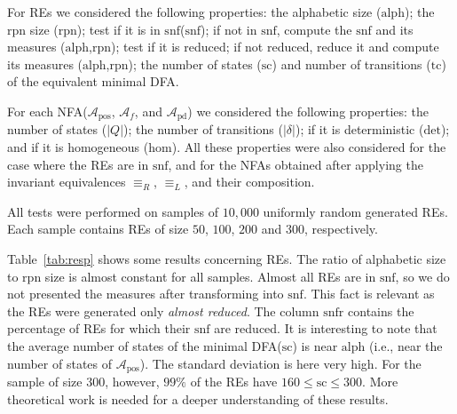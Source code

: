 \documentclass{llncs}
\newcommand{\dfa}{DFA\xspace}
\newcommand{\NFA}{NFA\xspace}
\newcommand{\nfas}{NFAs\xspace}
\newcommand{\res}{REs\xspace}
\newcommand{\snf}{\mbox{$\mathrm{snf}$}\xspace}
\newcommand{\snfr}{\mbox{$\mathrm{snfr}$}\xspace}
\newcommand{\alphw}{\mbox{$\mathrm{alph}$}\xspace}
\newcommand{\rpn}{\mbox{$\mathrm{rpn}$}\xspace}
\newcommand{\stc}{\mbox{$\mathrm{sc}$}\xspace}
\newcommand{\ttc}{\mbox{$\mathrm{tc}$}\xspace}
\newcommand{\isdet}{\mbox{$\mathrm{det}$}\xspace}
\newcommand{\ishom}{\mbox{$\mathrm{hom}$}\xspace}
\newcommand{\nfa}{\mathcal{A}}
\newcommand{\pos}{{\mathrm{pos}}}
\newcommand{\pd}{{\mathrm{pd}}}
\begin{document}
For \res we considered the following properties: the alphabetic size
(\alphw); the \rpn size (\rpn); test if it is in \snf (\snf); if not in
\snf, compute the \snf and its measures (\alphw,\rpn); test if it is
reduced; if not reduced, reduce it and compute its measures
(\alphw,\rpn); the number of states (\stc) and number of transitions
(\ttc) of the equivalent minimal \dfa. 

For each \NFA ($\nfa_\pos$,
$\nfa_f$, and $\nfa_\pd$) we considered the following properties: the
number of states ($|Q|$); the number of transitions ($|\delta|$); if
it is deterministic (\isdet); and if it is homogeneous (\ishom). All
these properties were also considered for the case where the \res are
in \snf, and for the \nfas obtained after applying the invariant
equivalences $\equiv_R$, $\equiv_L$, and their composition.

All tests were performed on samples of $10,000$ uniformly random
generated \res. Each sample contains \res of size $50$, $100$, $200$
and $300$, respectively.

Table~\ref{tab:resp} shows some results concerning \res.  The ratio of
alphabetic size to \rpn size is almost constant for all
samples. Almost all \res are in \snf, so we do not
presented the measures after transforming into \snf. This fact is
relevant as the \res were generated only \emph{almost reduced}. The
column \snfr contains the percentage of \res for which their \snf are
reduced. It is interesting to note that the average number of states
of the minimal \dfa (\stc) is near \alphw{} (i.e., near the number of
states of $\nfa_\pos$). The standard deviation is here very high. For
the sample of size $300$, however, $99\%$ of the \res have $160\leq
\stc \leq 300$. More theoretical work is needed for a deeper
understanding of these results.
\end{document}
